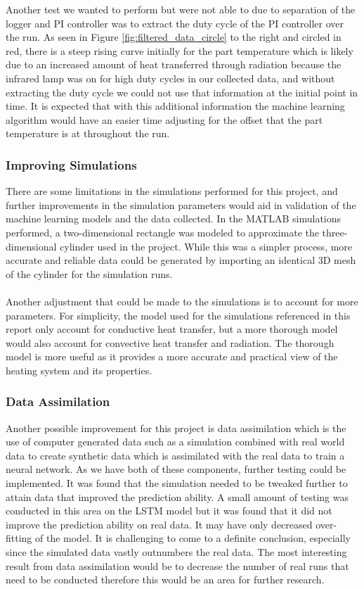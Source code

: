 Another test we wanted to perform but were not able to due to separation of the logger and PI controller was to extract the duty cycle of the PI controller over the run. As seen in Figure \ref{fig:filtered_data_circle} to the right and circled in red, there is a steep rising curve initially for the part temperature which is likely due to an increased amount of heat transferred through radiation because the infrared lamp was on for high duty cycles in our collected data, and without extracting the duty cycle we could not use that information at the initial point in time. It is expected that with this additional information the machine learning algorithm would have an easier time adjusting for the offset that the part temperature is at throughout the run.  \\

\subsubsection{Improving Simulations}
There are some limitations in the simulations performed for this project, and further improvements in the simulation parameters would aid in validation of the machine learning models and the data collected. In the MATLAB simulations performed, a two-dimensional rectangle was modeled to approximate the three-dimensional cylinder used in the project. While this was a simpler process, more accurate and reliable data could be generated by importing an identical 3D mesh of the cylinder for the simulation runs.  \\\\
Another adjustment that could be made to the simulations is to account for more parameters. For simplicity, the model used for the simulations referenced in this report only account for conductive heat transfer, but a more thorough model would also account for convective heat transfer and radiation. The thorough model is more useful as it provides a more accurate and practical view of the heating system and its properties.
\subsubsection{Data Assimilation}
Another possible improvement for this project is data assimilation which is the use of computer generated data such as a simulation combined with real world data to create synthetic data which is assimilated with the real data to train a neural network. As we have both of these components, further testing could be implemented. It was found that the simulation needed to be tweaked further to attain data that improved the prediction ability. A small amount of testing was conducted in this area on the LSTM model but it was found that it did not improve the prediction ability on real data. It may have only decreased over-fitting of the model. It is challenging to come to a definite conclusion, especially since the simulated data vastly outnumbers the real data. The most interesting result from data assimilation would be to decrease the number of real runs that need to be conducted therefore this would be an area for further research.
